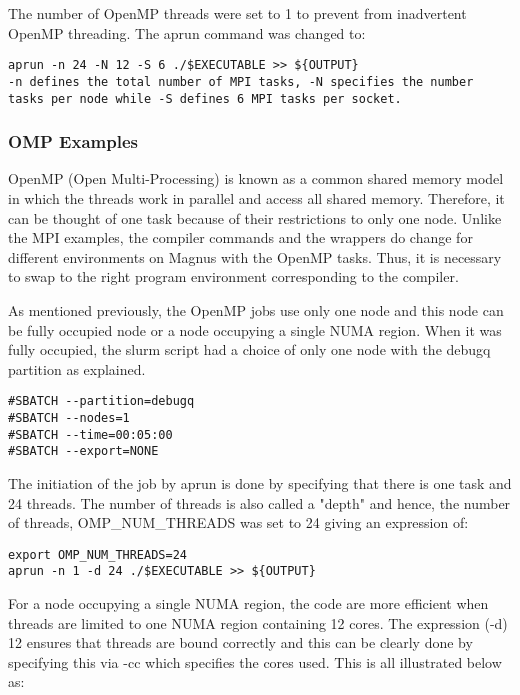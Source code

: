 \documentclass[journal]{IEEEtran}
\begin{document}
The number of OpenMP threads were set to 1 to prevent from inadvertent OpenMP threading. The aprun command was changed to:

\begin{verbatim}
aprun -n 24 -N 12 -S 6 ./$EXECUTABLE >> ${OUTPUT}
-n defines the total number of MPI tasks, -N specifies the number tasks per node while -S defines 6 MPI tasks per socket.
\end{verbatim}

\subsubsection{OMP Examples}

OpenMP (Open Multi-Processing) is known as a common shared memory model in which the threads work in parallel and access all shared memory. Therefore,
it can be thought of one task because of their restrictions to only one node. Unlike the MPI examples, the compiler commands and the wrappers do change 
for different environments on Magnus with the OpenMP tasks. Thus, it is necessary to swap to the right program environment corresponding to the compiler.

As mentioned previously, the OpenMP jobs use only one node and this node can be fully occupied node or a node occupying a single NUMA region. When it was 
fully occupied, the slurm script had a choice of only one node with the debugq partition as explained.

\begin{verbatim}
#SBATCH --partition=debugq
#SBATCH --nodes=1
#SBATCH --time=00:05:00
#SBATCH --export=NONE
\end{verbatim}

The initiation of the job by aprun is done by specifying that there is one task and 24 threads. The number of threads is also called a "depth" and hence,
the number of threads, OMP_NUM_THREADS was set to 24 giving an expression of:

\begin{verbatim}
export OMP_NUM_THREADS=24
aprun -n 1 -d 24 ./$EXECUTABLE >> ${OUTPUT}
\end{verbatim}

For a node occupying a single NUMA region, the code are more efficient when threads are limited to one NUMA region containing 12 cores. The expression 
(-d) 12 ensures that threads are bound correctly and this can be clearly done by specifying this via -cc which specifies the cores used. This is all 
illustrated below as:
\end{document}
